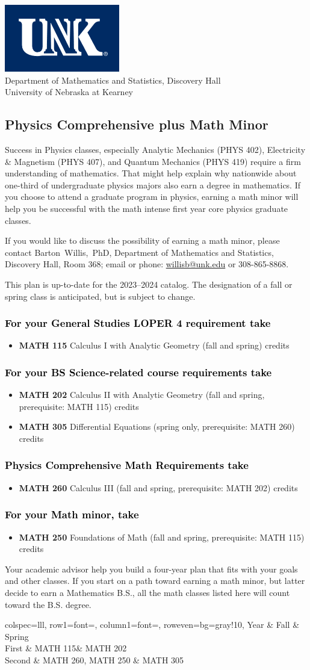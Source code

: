 \documentclass[10pt]{article}
\makeatletter
\newcommand{\calcone}{\textbf{MATH 115} Calculus I with Analytic Geometry (fall and spring) \dotfill 5 credits}
\newcommand{\calconeshort}{MATH 115}
\newcommand{\calctwo}{\textbf{MATH 202} Calculus II with Analytic Geometry (fall and spring, prerequisite: MATH 115) \dotfill 5 credits }
\newcommand{\calctwoshort}{MATH 202}
\newcommand{\foundations}{\textbf{MATH 250} Foundations of Math (fall and spring, prerequisite: MATH 115)  \dotfill 3 credits}
\newcommand{\foundationsshort}{MATH 250}
\newcommand{\calcthree}{\textbf{MATH 260} Calculus III  (fall and spring, prerequisite: MATH 202) \dotfill 5 credits}
\newcommand{\calcthreeshort}{MATH 260}
\newcommand{\diffeq}{\textbf{MATH 305}	Differential Equations (spring only, prerequisite: MATH 260) \dotfill 	3 credits}
\newcommand{\diffeqshort}{MATH 305}
\newcommand{\contactbw}{\mbox{Barton Willis, PhD}, Department of Mathematics and Statistics,  Discovery Hall, Room 368;
email or phone: \href{mailto:willisb@unk.edu}{willisb@unk.edu} or 308-865-8868.}
\newcommand{\forinfo}[2]{If you would like to discuss the possibility of earning a math {#1}, please contact \contactbw}
\newcommand{\catalog}{2023--2024 }
\newcommand{\LOPER}{LOPER\xspace}
\newcommand{\uptodate}{This plan is up-to-date for  the \catalog catalog. The designation of a fall or spring class is 
anticipated, but  is subject to change.}
\newcommand{\myheading}{
\begin{flushleft}
\includegraphics[scale=0.3]{unk-logo}\\
\setcounter{footnote}{0}
\vspace{0.25in}
 \textcolor{unkblue}{Department of Mathematics and Statistics, Discovery Hall} \\
  \textcolor{unkblue}{University of Nebraska at Kearney}
\end{flushleft}}
\newcommand{\mathminorALT}{
\begin{table}[h]
 \caption*{Suggested Math Minor program of study}
   \center
  \begin{tblr}{
      colspec={lll},
      row{1}={font=\bfseries},
      column{1}={font=\itshape},
      row{even}={bg=gray!10},
    }
     Year        & Fall  & Spring   \\
    \toprule      
      First & \calconeshort & \calctwoshort{}  \\  
      Second &  \calcthreeshort{},  \foundationsshort{}  & \diffeqshort \\
        \bottomrule
  \end{tblr}
   \end{table}}
\makeatother
\begin{document}
\newpage

\myheading


\subsection*{\textbf{\textcolor{unkblue}{Physics Comprehensive plus Math Minor}}}

\noindent Success in Physics classes, especially  Analytic Mechanics (PHYS 402), Electricity \& Magnetism (PHYS 407), and Quantum Mechanics (PHYS 419) require a 
firm understanding of mathematics. That might help explain why 
nationwide about one-third of undergraduate physics majors also 
earn a degree in mathematics. If you choose to attend a graduate 
program in physics, earning a math minor will help you be successful 
with the math intense first year core physics graduate classes.


\forinfo{minor}{Physics Comprehensive}

\uptodate

\subsubsection*{\textcolor{black}{For your General Studies \LOPER 4 requirement take}}
\begin{itemize}
\item \calcone
\end{itemize}

\subsubsection*{\textcolor{black}{For your BS Science-related course requirements take}}
\begin{itemize}
\item \calctwo
\item \diffeq
\end{itemize}


\subsubsection*{\textcolor{black}{Physics Comprehensive Math Requirements take}}
\begin{itemize}
 \item \calcthree
\end{itemize}

\subsubsection*{\textcolor{black}{For your Math minor, take}}
\begin{itemize}
\item \foundations
\end{itemize}
\vspace{0.1in}
\noindent Your academic advisor help you build a four-year plan that
fits with your goals and other classes. If you start on a path 
toward earning  a math minor, but latter decide to earn a 
Mathematics B.S., all the math classes listed here will count 
toward the B.S. degree.
\mathminorALT
\end{document}
